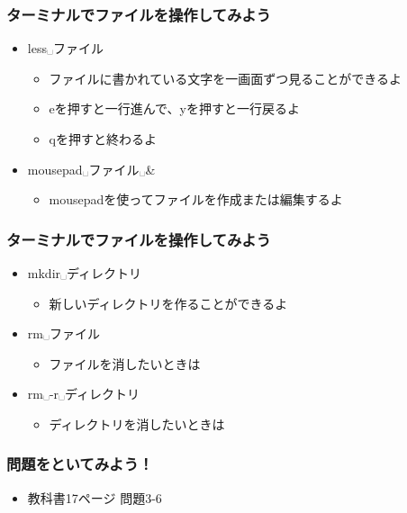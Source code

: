 \begin{frame}
    \frametitle{ターミナルでファイルを操作してみよう}
    \begin{itemize}
        \item less␣ファイル
        \begin{itemize}
            \item ファイルに書かれている文字を一画面ずつ見ることができるよ
            \item eを押すと一行進んで、yを押すと一行戻るよ
            \item qを押すと終わるよ
        \end{itemize}
        \item mousepad␣ファイル␣\&
        \begin{itemize}
            \item mousepadを使ってファイルを作成または編集するよ
        \end{itemize}
    \end{itemize}
\end{frame}

\begin{frame}
    \frametitle{ターミナルでファイルを操作してみよう}
    \begin{itemize}
        \item mkdir␣ディレクトリ
        \begin{itemize}
            \item 新しいディレクトリを作ることができるよ
        \end{itemize}
        \item rm␣ファイル
        \begin{itemize}
            \item ファイルを消したいときは
        \end{itemize}
        \item rm␣-r␣ディレクトリ
        \begin{itemize}
            \item ディレクトリを消したいときは
        \end{itemize}
    \end{itemize}
    \begin{figure}[h]
        \centering
        
    \end{figure}
\end{frame}

\begin{frame}
    \frametitle{問題をといてみよう！}
    \begin{itemize}
        \item 教科書17ページ 問題3-6
    \end{itemize}
\end{frame}
